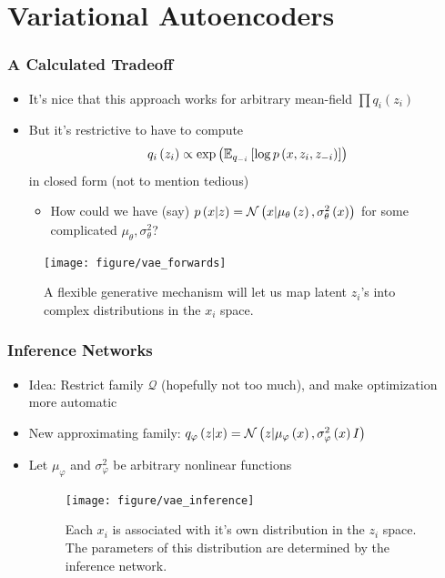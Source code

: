 \documentclass[10pt,mathserif]{beamer}
\begin{document}
\section{Variational Autoencoders}

\begin{frame}
  \frametitle{A Calculated Tradeoff}
  \begin{itemize}
  \item It's nice that this approach works for arbitrary mean-field $\prod
    q_{i}\left(z_i\right)$
  \item But it's restrictive to have to compute
    \begin{align*}
      q_i\left(z_i\right) \propto \operatorname{exp}\left(\mathbb{E}_{q_{-i}}\left[{\log p\left(x, z_i, z_{-i}\right)}\right]\right)
    \end{align*}
    in closed form (not to mention tedious)
    \begin{itemize}
    \item How could we have (say) $p\left(x \vert z\right) = \mathcal{N}\left(x \vert
      \mu_{\theta}\left(z\right), \sigma^{2}_{\theta}\left(x\right)\right)$ for some
      complicated $\mu_{\theta}, \sigma^{2}_{\theta}$?
    \end{itemize}
  \end{itemize}
\begin{figure}[ht]
  \centering
  \texttt{[image: figure/vae\_forwards]}
  \caption{A flexible generative mechanism will let us map latent $z_i$'s into
    complex distributions in the $x_i$ space. \label{fig:vae_forwards} }
\end{figure}

\end{frame}

\begin{frame}
  \frametitle{Inference Networks}
  \begin{itemize}
  \item Idea: Restrict family $\mathcal{Q}$ (hopefully not too much), and make
    optimization more automatic
  \item New approximating family: $q_{\varphi}\left(z \vert x\right) = \mathcal{N}\left(z \vert
    \mu_{\varphi}\left(x\right), \sigma^{2}_{\varphi}\left(x\right) I\right)$
  \item Let $\mu_{\varphi}$ and $\sigma^{2}_{\varphi}$ be arbitrary nonlinear
    functions
    \begin{figure}
        \centering
        \texttt{[image: figure/vae\_inference]}
        \caption{Each $x_i$ is associated with it's own distribution in the
          $z_i$ space. The parameters of this distribution are determined by the
          inference network. \label{fig:vae_inference} }
    \end{figure}
  \end{itemize}
\end{frame}
\end{document}
